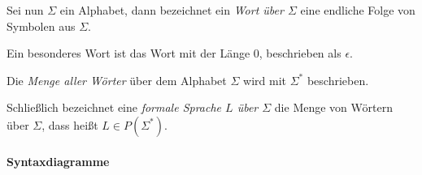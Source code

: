 \documentclass{scrreprt}
\begin{document}
Sei nun $\Sigma$ ein Alphabet, dann bezeichnet ein
\emph{Wort über $\Sigma$} eine endliche Folge von Symbolen aus $\Sigma$.

Ein besonderes Wort ist das Wort mit der Länge $0$, beschrieben als
$\epsilon$.

Die \emph{Menge aller Wörter} über dem Alphabet $\Sigma$ wird mit $\Sigma^*$
beschrieben.

Schließlich bezeichnet eine \emph{formale Sprache $L$ über $\Sigma$} die Menge
von Wörtern über $\Sigma$, dass heißt $L \in P(\Sigma^*)$.

\paragraph{Syntaxdiagramme}
\end{document}
